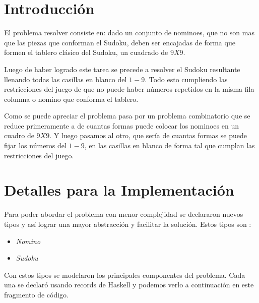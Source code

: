 \documentclass[a4paper,10pt,twocolumn]{article}
\begin{document}
\section{Introducción}\label{sec:intro}
El problema  resolver consiste en: dado un conjunto de nominoes, que no son mas que las piezas que conforman el Sudoku, deben ser encajadas de forma que formen el tablero clásico del Sudoku, un cuadrado de $ 9 X 9$. 

Luego de haber logrado este tarea se precede a resolver el Sudoku resultante llenando todas las casillas en blanco del $1 - 9$. Todo esto cumpliendo las restricciones del juego de que no puede haber números repetidos en la misma fila columna o nomino que conforma el tablero. 

Como se puede apreciar el problema pasa por un problema combinatorio que se reduce primeramente a de cuantas formas puede colocar los nominoes en un cuadro de  $9 X 9$. Y luego pasamos al otro, que sería de cuantas formas se puede fijar los números del  $1 - 9 $, en  las casillas en blanco de forma tal que cumplan las restricciones del juego.   




\section{Detalles para la Implementación}\label{sec:dev}
Para poder abordar el problema con menor complejidad se declararon nuevos tipos y así lograr una mayor abstracción y facilitar la solución. Estos tipos son : 

\begin{itemize}
	\item \emph{Nomino}
	\item \emph{Sudoku}
\end{itemize}
  
Con estos tipos se modelaron los principales componentes del problema. Cada una se declaró usando records de Haskell y podemos verlo a continuación en este fragmento de código.   
\end{document}
